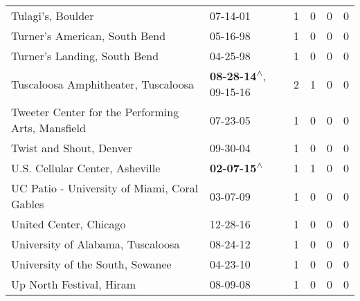 \begin{supertabular}{p{0.4\textwidth}p{0.3\textwidth}p{0.05\textwidth}p{0.05\textwidth}p{0.05\textwidth}p{0.05\textwidth}}
                                                            Tulagi's, Boulder &                                                                  07-14-01\textsuperscript{} &  1 &  0 &  0 &  0 \\
                                                Turner's American, South Bend &                                                                  05-16-98\textsuperscript{} &  1 &  0 &  0 &  0 \\
                                                 Turner's Landing, South Bend &                                                                  04-25-98\textsuperscript{} &  1 &  0 &  0 &  0 \\
                                          Tuscaloosa Amphitheater, Tuscaloosa &                     \textbf{08-28-14\textsuperscript{$\wedge$}}, 09-15-16\textsuperscript{} &  2 &  1 &  0 &  0 \\
                            Tweeter Center for the Performing Arts, Mansfield &                                                                  07-23-05\textsuperscript{} &  1 &  0 &  0 &  0 \\
                                                      Twist and Shout, Denver &                                                                  09-30-04\textsuperscript{} &  1 &  0 &  0 &  0 \\
                                              U.S. Cellular Center, Asheville &                                                 \textbf{02-07-15\textsuperscript{$\wedge$}} &  1 &  1 &  0 &  0 \\
                                 UC Patio - University of Miami, Coral Gables &                                                                  03-07-09\textsuperscript{} &  1 &  0 &  0 &  0 \\
                                                       United Center, Chicago &                                                                  12-28-16\textsuperscript{} &  1 &  0 &  0 &  0 \\
                                            University of Alabama, Tuscaloosa &                                                                  08-24-12\textsuperscript{} &  1 &  0 &  0 &  0 \\
                                             University of the South, Sewanee &                                                                  04-23-10\textsuperscript{} &  1 &  0 &  0 &  0 \\
                                                     Up North Festival, Hiram &                                                                  08-09-08\textsuperscript{} &  1 &  0 &  0 &  0 \\

\end{supertabular}
